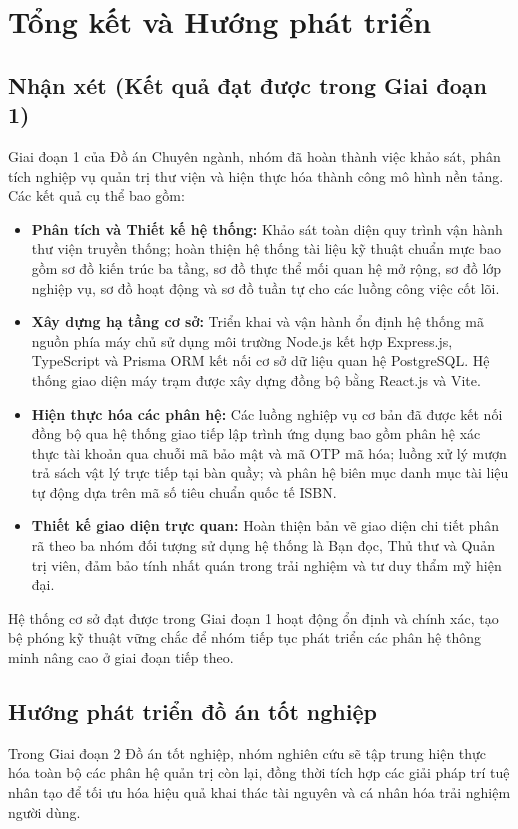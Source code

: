 \section{Tổng kết và Hướng phát triển}

\subsection{Nhận xét (Kết quả đạt được trong Giai đoạn 1)}
Giai đoạn 1 của Đồ án Chuyên ngành, nhóm đã hoàn thành việc khảo sát, phân tích nghiệp vụ quản trị thư viện và hiện thực hóa thành công mô hình nền tảng. Các kết quả cụ thể bao gồm:

\begin{itemize}
    \item \textbf{Phân tích và Thiết kế hệ thống:} Khảo sát toàn diện quy trình vận hành thư viện truyền thống; hoàn thiện hệ thống tài liệu kỹ thuật chuẩn mực bao gồm sơ đồ kiến trúc ba tầng, sơ đồ thực thể mối quan hệ mở rộng, sơ đồ lớp nghiệp vụ, sơ đồ hoạt động và sơ đồ tuần tự cho các luồng công việc cốt lõi.
    \item \textbf{Xây dựng hạ tầng cơ sở:} Triển khai và vận hành ổn định hệ thống mã nguồn phía máy chủ sử dụng môi trường Node.js kết hợp Express.js, TypeScript và Prisma ORM kết nối cơ sở dữ liệu quan hệ PostgreSQL. Hệ thống giao diện máy trạm được xây dựng đồng bộ bằng React.js và Vite.
    \item \textbf{Hiện thực hóa các phân hệ:} Các luồng nghiệp vụ cơ bản đã được kết nối đồng bộ qua hệ thống giao tiếp lập trình ứng dụng bao gồm phân hệ xác thực tài khoản qua chuỗi mã bảo mật và mã OTP mã hóa; luồng xử lý mượn trả sách vật lý trực tiếp tại bàn quầy; và phân hệ biên mục danh mục tài liệu tự động dựa trên mã số tiêu chuẩn quốc tế ISBN.
    \item \textbf{Thiết kế giao diện trực quan:} Hoàn thiện bản vẽ giao diện chi tiết phân rã theo ba nhóm đối tượng sử dụng hệ thống là Bạn đọc, Thủ thư và Quản trị viên, đảm bảo tính nhất quán trong trải nghiệm và tư duy thẩm mỹ hiện đại.
\end{itemize}

Hệ thống cơ sở đạt được trong Giai đoạn 1 hoạt động ổn định và chính xác, tạo bệ phóng kỹ thuật vững chắc để nhóm tiếp tục phát triển các phân hệ thông minh nâng cao ở giai đoạn tiếp theo.

\subsection{Hướng phát triển đồ án tốt nghiệp }
Trong Giai đoạn 2 Đồ án tốt nghiệp, nhóm nghiên cứu sẽ tập trung hiện thực hóa toàn bộ các phân hệ quản trị còn lại, đồng thời tích hợp các giải pháp trí tuệ nhân tạo để tối ưu hóa hiệu quả khai thác tài nguyên và cá nhân hóa trải nghiệm người dùng.

